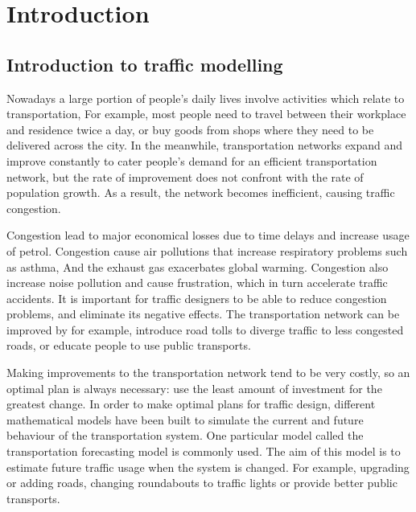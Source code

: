 \chapter{Introduction}


\section{Introduction to traffic modelling}
Nowadays a large portion of people's daily lives involve activities which relate to transportation,
For example, most people need to travel between their workplace and residence twice a day,
or buy goods from shops where they need to be delivered across the city.
In the meanwhile, 
transportation networks expand and improve constantly to cater people's demand for an efficient transportation network,
but the rate of improvement does not confront with the rate of population growth.
As a result,
the network becomes inefficient, causing traffic congestion.

Congestion lead to major economical losses due to time delays and increase usage of petrol.
Congestion cause air pollutions that increase respiratory problems such as asthma, 
And the exhaust gas exacerbates global warming.
Congestion also increase noise pollution and cause frustration,
which in turn accelerate traffic accidents.
It is important for traffic designers to be able to reduce congestion problems,
and eliminate its negative effects.
The transportation network can be improved by for example,
introduce road tolls to diverge traffic to less congested roads,
or educate people to use public transports.

Making improvements to the transportation network tend to be very costly,
so an optimal plan is always necessary:
use the least amount of investment for the greatest change.
In order to make optimal plans for traffic design,
different mathematical models have been built to simulate the current and future behaviour of the transportation system.
One particular model called the transportation forecasting model is commonly used.
The aim of this model is to estimate future traffic usage when the system is changed.
For example, upgrading or adding roads, changing roundabouts to traffic lights or provide better public transports. 

